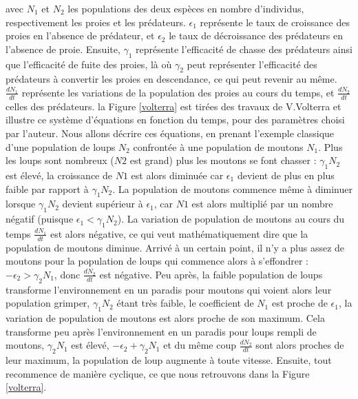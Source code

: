 		avec $N_1$ et $N_2$ les populations des deux espèces en nombre d'individus, respectivement les proies et les prédateurs. $\epsilon_1$ représente le taux de croissance des proies en l'absence de prédateur, et $\epsilon_2$ le taux de décroissance des prédateurs en l'absence de proie. Ensuite, $\gamma_1$ représente l'efficacité de chasse des prédateurs ainsi que l'efficacité de fuite des proies, là où $\gamma_2$ peut représenter l'efficacité des prédateurs à convertir les proies en descendance, ce qui peut revenir au même. $\frac{dN_1}{dt}$ représente les variations de la population des proies au cours du temps, et $\frac{dN_2}{dt}$ celles des prédateurs. la Figure \ref{volterra} est tirées des travaux de V.Volterra et illustre ce système d'équations en fonction du temps, pour des paramètres choisi par l'auteur. Nous allons décrire ces équations, en prenant l'exemple classique d'une population de loups $N_2$ confrontée à une population de moutons $N_1$. Plus les loups sont nombreux ($N2$ est grand) plus les moutons se font chasser : $\gamma_1 N_2$ est élevé, la croissance de $N1$ est alors diminuée car $\epsilon_1$ devient de plus en plus faible par rapport à $\gamma_1 N_2$. La population de moutons commence même à diminuer lorsque $\gamma_1 N_2$ devient supérieur à $\epsilon_1$, car $N1$ est alors multiplié par un nombre négatif (puisque $\epsilon_1 < \gamma_1 N_2$). La variation de population de moutons au cours du temps $\frac{dN_1}{dt}$ est alors négative, ce qui veut mathématiquement dire que la population de moutons diminue. Arrivé à un certain point, il n'y a plus assez de moutons pour la population de loups qui commence alors à s'effondrer : $-\epsilon_2 > \gamma_2 N_1$, donc $\frac{dN_2}{dt}$ est négative. Peu après, la faible population de loups transforme l'environnement en un paradis pour moutons qui voient alors leur population grimper, $\gamma_1 N_2$ étant très faible, le coefficient de $N_1$ est proche de $\epsilon_1$, la variation de population de moutons est alors proche de son maximum. Cela transforme peu après l'environnement en un paradis pour loups rempli de moutons, $\gamma_2 N_1$ est élevé, $- \epsilon_2 + \gamma_2 N_1$ et du même coup $\frac{dN_2}{dt}$ sont alors proches de leur maximum, la population de loup augmente à toute vitesse. Ensuite, tout recommence de manière cyclique, ce que nous retrouvons dans la Figure \ref{volterra}.
		
